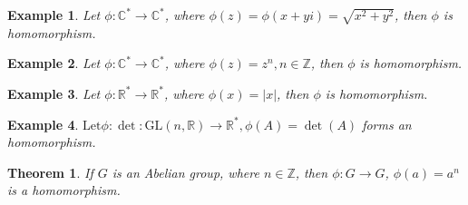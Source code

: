 \documentclass{article}
\theoremstyle{MyNonumberplain}
\theoremstyle{break}
\newcommand{\p}{\phi}
\newcommand{\tmop}{\text}
\theoremstyle{break}
\newtheorem{theorem}{Theorem}[section]
\newtheorem{example}{Example}[section]
\theoremstyle{break}
\theoremstyle{definition}
\theoremstyle{break}
\begin{document}
\begin{expbox}
    \begin{example}
        Let $\p : \mathbb{C}^{\ast} \rightarrow \mathbb{C}^{\ast}$, where $\p (z) = \p
        (x + y i) = \sqrt{x^2 + y^2}$, then $\p$ is homomorphism. 
    \end{example}
\end{expbox}
\begin{expbox}
    \begin{example}
        Let $\p : \mathbb{C}^{\ast} \rightarrow \mathbb{C}^{\ast}$, where $\p (z) =
        z^n, n \in \mathbb{Z}$, then $\p$ is homomorphism.
    \end{example}
\end{expbox}
\begin{expbox}
    \begin{example}
        Let $\p : \mathbb{R}^{\ast} \rightarrow \mathbb{R}^{\ast}$, where $\p (x) = |
        x |$, then $\p$ is homomorphism.
    \end{example}
\end{expbox}
\begin{expbox}
    \begin{example}
        $\tmop{Let} \p : \det : \tmop{GL} (n, \mathbb{R}) \rightarrow
        \mathbb{R}^{\ast}, \p (A) = \det (A)$ forms an homomorphism.
    \end{example}
\end{expbox}    

\begin{thmbox}
    \begin{theorem}
        If $G$ is an Abelian group, where $n \in \mathbb{Z}$, then $\p : G \rightarrow
        G$, $\p (a) = a^n$ is a homomorphism.
    \end{theorem}
\end{thmbox}
\end{document}
